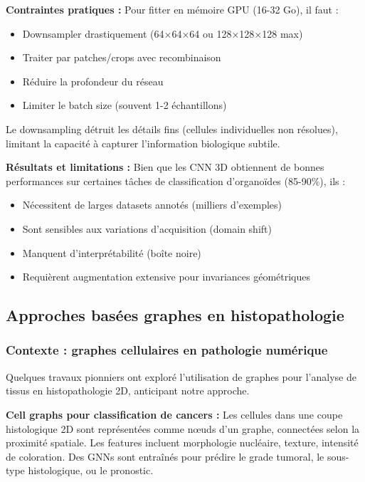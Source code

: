 \textbf{Contraintes pratiques :}
Pour fitter en mémoire GPU (16-32 Go), il faut :
\begin{itemize}
    \item Downsampler drastiquement (64×64×64 ou 128×128×128 max)
    \item Traiter par patches/crops avec recombinaison
    \item Réduire la profondeur du réseau
    \item Limiter le batch size (souvent 1-2 échantillons)
\end{itemize}

Le downsampling détruit les détails fins (cellules individuelles non résolues), limitant la capacité à capturer l'information biologique subtile.

\textbf{Résultats et limitations :}
Bien que les CNN 3D obtiennent de bonnes performances sur certaines tâches de classification d'organoïdes (85-90\%), ils :
\begin{itemize}
    \item Nécessitent de larges datasets annotés (milliers d'exemples)
    \item Sont sensibles aux variations d'acquisition (domain shift)
    \item Manquent d'interprétabilité (boîte noire)
    \item Requièrent augmentation extensive pour invariances géométriques
\end{itemize}

\subsection{Approches basées graphes en histopathologie}

\subsubsection{Contexte : graphes cellulaires en pathologie numérique}

Quelques travaux pionniers ont exploré l'utilisation de graphes pour l'analyse de tissus en histopathologie 2D, anticipant notre approche.

\textbf{Cell graphs pour classification de cancers :}
Les cellules dans une coupe histologique 2D sont représentées comme nœuds d'un graphe, connectées selon la proximité spatiale. Les features incluent morphologie nucléaire, texture, intensité de coloration. Des GNNs sont entraînés pour prédire le grade tumoral, le sous-type histologique, ou le pronostic.

